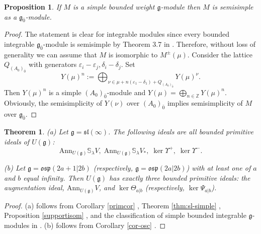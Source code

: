 \documentclass[12pt]{amsart}
\makeatletter
\def\@putname#1#2#3#4{\def\@@ref{#3}\let\old@bf\bf
        \def\bf##1{\old@bf\if?\noexpand##1?{#4}\else##1\fi}%
	#1{#2}%
        \let\bf\old@bf}
\def\@putname#1#2#3#4{\def\@@ref{#3}\let\old@bf\bf	%
	\let\old@reset@font\reset@font			%
        \def\bf##1{\old@bf\if?\noexpand##1?{#4}\else##1\fi}%
	\def\reset@font##1##2{\old@reset@font##1\if?\noexpand##2?{#4}\else##2\fi}#1{#2}%
        \let\bf\old@bf\let\reset@font\old@reset@font}
\let\my@ref=\ref
\def\ref#1{\@putname\my@ref{#1}{#1}{\tiny\rm\@@ref}}
\let\my@cite=\cite
\def\cite#1{\@putname\my@cite{#1}{\@citeb}{\tiny\rm\@@ref}}
\theoremstyle{plain} %
\numberwithin{equation}{section}
\theoremstyle{definition}
\theoremstyle{remark}
\theoremstyle{plain} %
\newtheorem{theorem}[definition]{Theorem}
\newtheorem{proposition}[definition]{Proposition}
\renewcommand{\gg}{\mathfrak{g}}
\newcommand{\Ann}{\mathrm{Ann}}
\def\gg{\mathfrak{g}}
\makeatother
\begin{document}
      \begin{proposition} \label{restriction}  If $M$ is a simple bounded weight $\gg$-module then $M$ is semisimple as
      a  $\gg_{\bar 0}$-module.
      \end{proposition}
      \begin{proof} The statement is clear for integrable modules since every bounded integrable $\gg_{\bar 0}$-module is semisimple by Theorem 3.7 in \cite{PSer2}.
        Therefore, without loss of generality we can assume that $M$ is isomorphic to $M^{\pm}(\mu)$.  Consider the lattice $Q_{(A_0)_{\bar{0}}}$ with generators $\varepsilon_i -\varepsilon_j, \delta_i - \delta_j$. Set
        $$Y(\mu)^n:=\bigoplus_{\nu\in \mu+n(\varepsilon_1-\delta_1) + Q_{(A_0)_{\bar{0}}}}Y(\mu)^\nu.$$
        Then $Y(\mu)^n$ is a simple $(A_0)_{\bar 0}$-module and $Y(\mu)=\bigoplus_{n\in\mathbb Z}Y(\mu)^n$. Obviously, the semisimplicity of $Y(\nu)$ over $(A_0)_{\bar 0}$ implies semisimplicity of $M$ over $\gg_{\bar 0}$.
        
        \end{proof}
 
        \begin{theorem}\label{primitivesl}
          (a)  Let $\gg=\mathfrak{sl}(\infty)$. The following ideals are all bounded primitive  ideals of $U(\gg)$:
          $$\Ann_{U(\gg)} \mathbb S_\lambda V ,\;  \Ann_{U(\gg)} \mathbb S_\lambda V_*, \; \ker\Upsilon^+, \; \ker \Upsilon^-.$$

          (b) Let $\gg=\mathfrak{osp}(2a+1|2b)$ (respectively, $\gg=\mathfrak{osp}(2a|2b)$)  with at  least one of $a$ and $b$ equal infinity. Then
          $U(\gg)$ has exactly three bounded        primitive ideals: the augmentation ideal, $\Ann_{U(\gg)} V$, and $\ker\Theta_{a|b}$ (respectively, $\ker\Psi_{a|b}$).
          \end{theorem}
          \begin{proof}  (a) follows from Corollary \ref{primcor}, Theorem \ref{thm:sl-simple}, Proposition \ref{supportisom}, and the classification of simple bounded integrable $\gg$-modules in \cite{CP}.
            (b) follows from Corollary \ref{cor-osc}.
            \end{proof}


          
       
\end{document}
